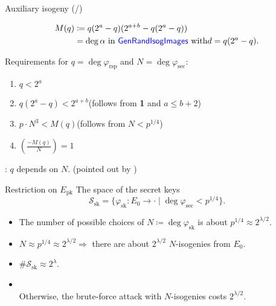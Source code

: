 \begin{frame}{Auxiliary isogeny (/\auxRIItotal{})}

    \begin{align*}
        M(q) &\coloneqq q(2^a - q)(2^{a + b} - q(2^a - q))\\
            &= \deg\alpha \text{ in \textcolor{blue}{\textsf{GenRandIsogImages}} with} d = q(2^a - q).
    \end{align*}

    \vspace{10pt}
    Requirements for $q = \deg\varphi_\mathrm{rsp}$ and $N = \deg\varphi_\mathrm{sec}$:
    \begin{enumerate}
        \item $q < 2^a$
        \item $q(2^a - q) < 2^{a + b}$\quad (follows from \textbf{1} and $a \leq b + 2$)
        \item $p \cdot N^3 < M(q)$\qquad (follows from $N < p^{1/4}$)
        \item $\left(\frac{-M(q)}{N}\right) = 1$
    \end{enumerate}

    \vspace{10pt}
     : $q$ depends on $N$.\quad
    (pointed out by \cite{CCILV2024sqisign2d_attack})
\end{frame}

\begin{frame}{Restriction on $E_\mathrm{pk}$}
    The space of the secret keys
    $$
        \mathcal{S}_\mathrm{sk} = \{
            \varphi_\mathrm{sk}: E_0 \to \cdot
            \mid \deg\varphi_{\mathrm{sec}} < p^{1/4} \}.
    $$
    \begin{itemize}
        \setlength{\itemsep}{10pt}
        \item The number of possible choices of $N \coloneqq \deg\varphi_\mathrm{sk}$ is about $p^{1/4} \approx 2^{\lambda/2}$.
        \item $N \approx p^{1/4} \approx 2^{\lambda/2} \Rightarrow$ there are about $2^{\lambda/2}$ $N$-isogenies from $E_0$.
        \item $\#\mathcal{S}_\mathrm{sk} \approx 2^{\lambda}$.
        \item {}\\
            Otherwise, the brute-force attack with $N$-isogenies costs $2^{\lambda/2}$.
    \end{itemize}

\end{frame}

